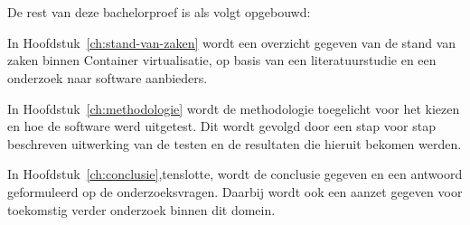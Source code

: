 \section{}
\label{sec:opzet-bachelorproef}


De rest van deze bachelorproef is als volgt opgebouwd:

In Hoofdstuk~\ref{ch:stand-van-zaken} wordt een overzicht gegeven van de stand van zaken binnen Container virtualisatie, op basis van een literatuurstudie en een onderzoek naar software aanbieders.

In Hoofdstuk~\ref{ch:methodologie} wordt de methodologie toegelicht voor het kiezen en hoe de software werd uitgetest. Dit wordt gevolgd door een stap voor stap beschreven uitwerking van de testen en de resultaten die hieruit bekomen werden. 

In Hoofdstuk~\ref{ch:conclusie},tenslotte, wordt de conclusie gegeven en een antwoord geformuleerd op de onderzoeksvragen. Daarbij wordt ook een aanzet gegeven voor toekomstig verder onderzoek binnen dit domein.